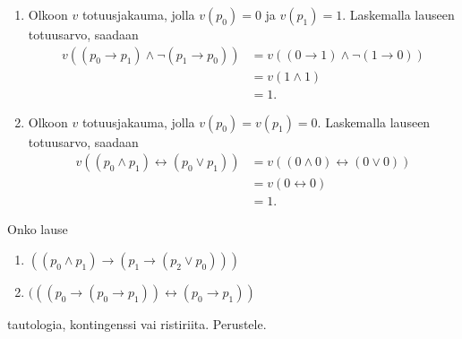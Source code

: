 \documentclass[11pt,a4paper]{amsart}
\begin{document}
\begin{solution}
\leavevmode\par
\begin{enumerate}[label=\alph*), nosep]
\item Olkoon \(v\) totuusjakauma, jolla \(v(p_0) = 0\) ja \(v(p_1) = 1\).
Laskemalla lauseen totuusarvo, saadaan
\[
\begin{aligned}
  v((p_0 \rightarrow p_1) \land \neg(p_1 \rightarrow p_0)) &=
  v((0 \rightarrow 1) \land \neg(1 \rightarrow 0)) \\
  &= v(1 \land 1) \\
  &= 1.
\end{aligned}
\]

\item Olkoon \(v\) totuusjakauma, jolla \(v(p_0) = v(p_1) = 0\).
Laskemalla lauseen totuusarvo, saadaan
\[
\begin{aligned}
  v((p_0 \land p_1) \leftrightarrow (p_0 \lor p_1)) &=
  v((0 \land 0) \leftrightarrow (0 \lor 0)) \\
  &= v(0 \leftrightarrow 0) \\
  &= 1.
\end{aligned}
\]
\end{enumerate}
\end{solution}

\begin{exercise}
Onko lause
\begin{enumerate}[label=\alph*), nosep]
\item \(((p_0 \land p_1) \rightarrow (p_1 \rightarrow (p_2 \lor p_0)))\)
\item \((((p_0 \rightarrow (p_0 \rightarrow p_1)) \leftrightarrow (p_0
\rightarrow p_1))\)
\end{enumerate}
tautologia, kontingenssi vai ristiriita. Perustele.
\end{exercise}
\end{document}
